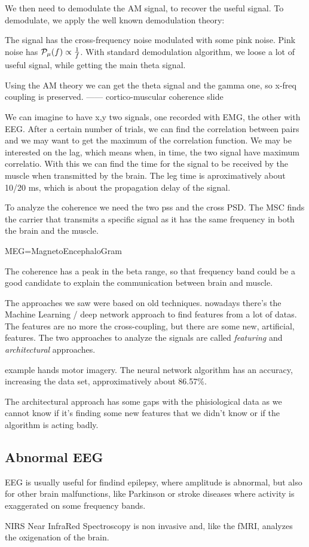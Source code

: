 We then need to demodulate the AM signal, to recover the useful signal. To demodulate, we apply the well known demodulation theory:

The signal has the cross-frequency noise modulated with some pink noise. Pink noise has $\P_\mu(f) \propto \frac{1}{f}$. With standard demodulation algorithm, we loose a lot of useful signal, while getting the main theta signal.

Using the AM theory we can get the theta signal and the gamma one, so x-freq coupling is preserved.
------
cortico-muscular coherence slide

We can imagine to have x,y two signals, one recorded with EMG, the other with EEG. After a certain number of trials, we can find the correlation between pairs and we may want to get the maximum of the correlation function. We may be interested on the lag, which means when, in time, the two signal have maximum correlatio. With this we can find the time for the signal to be received by the muscle when transmitted by the brain. The leg time is aproximatively about 10/20 ms, which is about the propagation delay of the signal.

To analyze the coherence we need the two pss and the cross PSD. The MSC finds the carrier that transmits a specific signal as it has the same frequency in both the brain and the muscle.

MEG=MagnetoEncephaloGram

The coherence has a peak in the beta range, so that frequency band could be a good candidate to explain the communication between brain and muscle.

The approaches we saw were based on old techniques. nowadays there's the Machine Learning / deep network approach to find features from a lot of datas. The features are no more the cross-coupling, but there are some new, artificial, features. The two approaches to analyze the signals are called \emph{featuring} and \emph{architectural} approaches.

example hands motor imagery. The neural network algorithm has an accuracy, increasing the data set, approximatively about 86.57\%.

The architectural approach has some gaps with the phisiological data as we cannot know if it's finding some new features that we didn't know or if the algorithm is acting badly.

\subsection{Abnormal EEG}
EEG is usually useful for findind epilepsy, where amplitude is abnormal, but also for other brain malfunctions, like Parkinson or stroke diseases where activity is exaggerated on some frequency bands.

NIRS Near InfraRed Spectroscopy is non invasive and, like the fMRI, analyzes the oxigenation of the brain.
